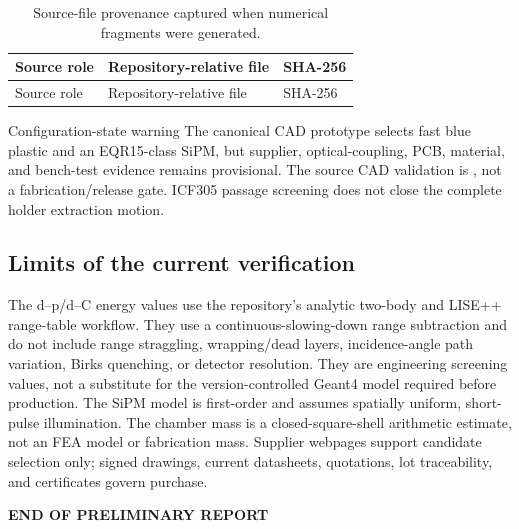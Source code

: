 \documentclass[10pt,letterpaper]{article}
\begin{document}
\begin{longtable}{L{0.18\textwidth}L{0.47\textwidth}L{0.27\textwidth}}
  \caption{Source-file provenance captured when numerical fragments were generated.}\\
  \toprule
  Source role & Repository-relative file & SHA-256 \\
  \midrule
  \endfirsthead
  \toprule
  Source role & Repository-relative file & SHA-256 \\
  \midrule
  \endhead
  
\end{longtable}

\begin{notebox}{Configuration-state warning}
  The canonical CAD prototype selects fast blue plastic and an EQR15-class SiPM, but supplier,
  optical-coupling, PCB, material, and bench-test evidence remains provisional. The source CAD
  validation is \SourceValidationMode, not a fabrication/release gate. ICF305 passage screening
  does not close the complete holder extraction motion.
\end{notebox}

\subsection{Limits of the current verification}

The d--p/d--C energy values use the repository's analytic two-body and LISE++ range-table
workflow. They use a continuous-slowing-down range subtraction and do not include range
straggling, wrapping/dead layers, incidence-angle path variation, Birks quenching, or detector
resolution. They are engineering screening values, not a substitute for the version-controlled
Geant4 model required before production. The SiPM model is first-order and assumes spatially uniform,
short-pulse illumination. The chamber mass is a closed-square-shell arithmetic estimate, not
an FEA model or fabrication mass. Supplier webpages support candidate selection only; signed
drawings, current datasheets, quotations, lot traceability, and certificates govern purchase.

\clearpage
\nocite{polarimeter_repo}
\printbibliography[title={References and supplier evidence}]

\vfill
\begin{center}
  {\sffamily\small\bfseries\color{ReportMuted} END OF PRELIMINARY REPORT}
\end{center}
\end{document}
